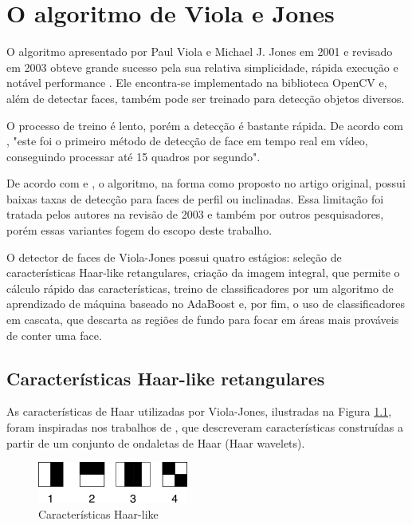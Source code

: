 \chapter{O algoritmo de Viola e Jones}

O algoritmo apresentado por Paul Viola e Michael J. Jones em 2001 \cite{Viola01rapidobject} \cite{viola2004robust} e revisado em 2003 \cite{jones2003fast} obteve grande sucesso pela sua relativa simplicidade, rápida execução e notável performance \cite{jensen2008implementing}. Ele encontra-se implementado na biblioteca OpenCV \cite{bradski2000intel} \cite{opencvdocs} e, além de detectar faces, também pode ser treinado para detecção objetos diversos.

O processo de treino é lento, porém a detecção é bastante rápida. De acordo com \citet{omaia2009sistema}, "este foi o primeiro método de detecção de face em tempo real em vídeo, conseguindo processar até 15 quadros por segundo".

De acordo com \cite{zhang2010survey} e \cite{Viola01rapidobject}, o algoritmo, na forma como proposto no artigo original, possui baixas taxas de detecção para faces de perfil ou inclinadas. Essa limitação foi tratada pelos autores na revisão de 2003 \cite{jones2003fast} e também por outros pesquisadores, porém essas variantes fogem do escopo deste trabalho.

O detector de faces de Viola-Jones possui quatro estágios: seleção de características Haar-like retangulares, criação da imagem integral, que permite o cálculo rápido das características, treino de classificadores por um algoritmo de aprendizado de máquina baseado no AdaBoost e, por fim, o uso de classificadores em cascata, que descarta as regiões de fundo para focar em áreas mais prováveis de conter uma face.


\section{Características Haar-like retangulares}

As características de Haar utilizadas por Viola-Jones, ilustradas na Figura \ref{fig:haar_like_features}, foram inspiradas nos trabalhos de \citet{papageorgiou1998general}, que descreveram características construídas a partir de um conjunto de ondaletas de Haar (Haar wavelets).

\begin{figure}[htbp]
   \begin{center}
     \includegraphics{figs/haar_like_features.png}
   \end{center}
   \caption{Características Haar-like \label{fig:haar_like_features}}
\end{figure}

